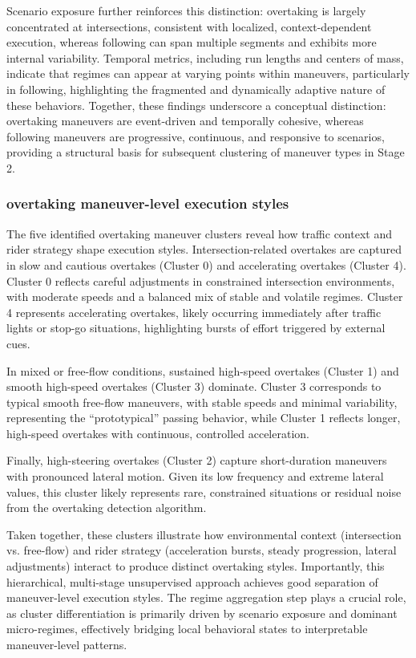 Scenario exposure further reinforces this distinction: overtaking is largely concentrated at intersections, consistent with localized, context-dependent execution, whereas following can span multiple segments and exhibits more internal variability. Temporal metrics, including run lengths and centers of mass, indicate that regimes can appear at varying points within maneuvers, particularly in following, highlighting the fragmented and dynamically adaptive nature of these behaviors. Together, these findings underscore a conceptual distinction: overtaking maneuvers are event-driven and temporally cohesive, whereas following maneuvers are progressive, continuous, and responsive to scenarios, providing a structural basis for subsequent clustering of maneuver types in Stage 2.

\subsubsection{overtaking maneuver-level execution styles}
The five identified overtaking maneuver clusters reveal how traffic context and rider strategy shape execution styles. Intersection-related overtakes are captured in slow and cautious overtakes (Cluster 0) and accelerating overtakes (Cluster 4). Cluster 0 reflects careful adjustments in constrained intersection environments, with moderate speeds and a balanced mix of stable and volatile regimes. Cluster 4 represents accelerating overtakes, likely occurring immediately after traffic lights or stop-go situations, highlighting bursts of effort triggered by external cues.

In mixed or free-flow conditions, sustained high-speed overtakes (Cluster 1) and smooth high-speed overtakes (Cluster 3) dominate. Cluster 3 corresponds to typical smooth free-flow maneuvers, with stable speeds and minimal variability, representing the “prototypical” passing behavior, while Cluster 1 reflects longer, high-speed overtakes with continuous, controlled acceleration.

Finally, high-steering overtakes (Cluster 2) capture short-duration maneuvers with pronounced lateral motion. Given its low frequency and extreme lateral values, this cluster likely represents rare, constrained situations or residual noise from the overtaking detection algorithm.

Taken together, these clusters illustrate how environmental context (intersection vs. free-flow) and rider strategy (acceleration bursts, steady progression, lateral adjustments) interact to produce distinct overtaking styles. Importantly, this hierarchical, multi-stage unsupervised approach achieves good separation of maneuver-level execution styles. The regime aggregation step plays a crucial role, as cluster differentiation is primarily driven by scenario exposure and dominant micro-regimes, effectively bridging local behavioral states to interpretable maneuver-level patterns.

